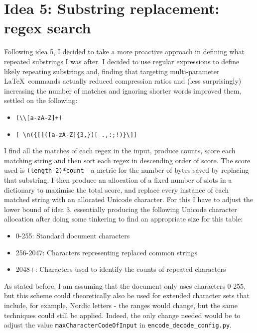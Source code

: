 \documentclass[11pt]{article} %
\begin{document}
\section{Idea 5: Substring replacement: regex search}

Following idea 5, I decided to take a more proactive approach in defining what repeated substrings I was after. I decided to use regular expressions to define likely repeating substrings and, finding that targeting multi-parameter \rmfamily\LaTeX\normalfont\ commands actually reduced compression ratios and (less surprisingly) increasing the number of matches and ignoring shorter words improved them, settled on the following:

\begin{itemize}
	\item \verb|(\\[a-zA-Z]+)|
	\item \verb|[ \n({[]([a-zA-Z]{3,})[ .,:;!)}\]]|
\end{itemize}

I find all the matches of each regex in the input, produce counts, score each matching string and then sort each regex in descending order of score. The score used is \verb|(length-2)*count| - a metric for the number of bytes saved by replacing that substring. I then produce an allocation of a fixed number of slots in a dictionary to maximise the total score, and replace every instance of each matched string with an allocated Unicode character. For this I have to adjust the lower bound of idea 3, essentially producing the following Unicode character allocation after doing some tinkering to find an appropriate size for this table:

\begin{itemize}
	\item 0-255: Standard document characters
	\item 256-2047: Characters representing replaced common strings
	\item 2048+: Characters used to identify the counts of repeated characters
\end{itemize}

As stated before, I am assuming that the document only uses characters 0-255, but this scheme could theoretically also be used for extended character sets that include, for example, Nordic letters - the ranges would change, but the same techniques could still be applied. Indeed, the only change needed would be to adjust the value \verb|maxCharacterCodeOfInput| in \verb|encode_decode_config.py|.
\end{document}
